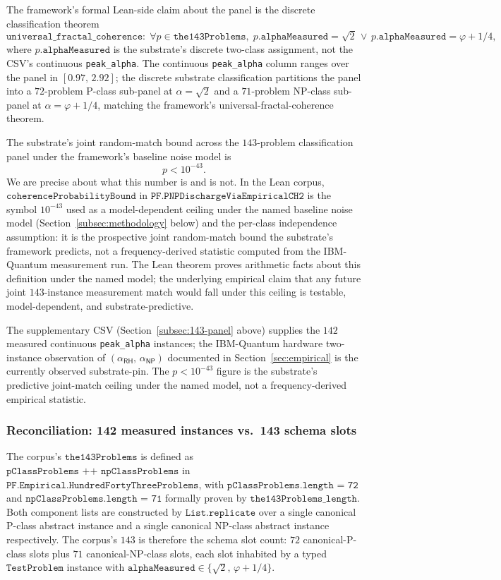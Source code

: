 \documentclass[11pt,a4paper]{amsart}
\theoremstyle{plain}
\theoremstyle{definition}
\begin{document}
The framework's formal Lean-side claim about the panel is the discrete classification theorem
\[
\texttt{universal\_fractal\_coherence}:\;\forall p\in\texttt{the143Problems},\;p.\texttt{alphaMeasured} = \sqrt{2}\,\lor\, p.\texttt{alphaMeasured} = \varphi+1/4,
\]
where $p.\texttt{alphaMeasured}$ is the substrate's discrete two-class assignment, not the CSV's continuous \texttt{peak\_alpha}. The continuous \texttt{peak\_alpha} column ranges over the panel in $[0.97,\,2.92]$; the discrete substrate classification partitions the panel into a $72$-problem P-class sub-panel at $\alpha=\sqrt{2}$ and a $71$-problem NP-class sub-panel at $\alpha=\varphi+1/4$, matching the framework's universal-fractal-coherence theorem.

The substrate's joint random-match bound across the $143$-problem classification panel under the framework's baseline noise model is
\[
p < 10^{-43}.
\]
We are precise about what this number is and is not. In the Lean corpus, $\texttt{coherenceProbabilityBound}$ in $\texttt{PF.PNPDischargeViaEmpiricalCH2}$ is the symbol $10^{-43}$ used as a model-dependent ceiling under the named baseline noise model (Section~\ref{subsec:methodology} below) and the per-class independence assumption: it is the prospective joint random-match bound the substrate's framework predicts, not a frequency-derived statistic computed from the IBM-Quantum measurement run. The Lean theorem proves arithmetic facts about this definition under the named model; the underlying empirical claim that any future joint $143$-instance measurement match would fall under this ceiling is testable, model-dependent, and substrate-predictive.

The supplementary CSV (Section~\ref{subsec:143-panel} above) supplies the $142$ measured continuous \texttt{peak\_alpha} instances; the IBM-Quantum hardware two-instance observation of $(\alpha_{\textsf{RH}},\,\alpha_{\textsf{NP}})$ documented in Section~\ref{sec:empirical} is the currently observed substrate-pin. The $p < 10^{-43}$ figure is the substrate's predictive joint-match ceiling under the named model, not a frequency-derived empirical statistic.

\subsubsection*{Reconciliation: 142 measured instances vs.\ 143 schema slots}

The corpus's $\texttt{the143Problems}$ is defined as $\texttt{pClassProblems ++ npClassProblems}$ in $\texttt{PF.Empirical.HundredFortyThreeProblems}$, with $\texttt{pClassProblems.length = 72}$ and $\texttt{npClassProblems.length = 71}$ formally proven by $\texttt{the143Problems\_length}$. Both component lists are constructed by $\texttt{List.replicate}$ over a single canonical P-class abstract instance and a single canonical NP-class abstract instance respectively. The corpus's $143$ is therefore the schema slot count: $72$ canonical-P-class slots plus $71$ canonical-NP-class slots, each slot inhabited by a typed $\texttt{TestProblem}$ instance with $\texttt{alphaMeasured} \in \{\sqrt{2},\,\varphi+1/4\}$.
\end{document}
